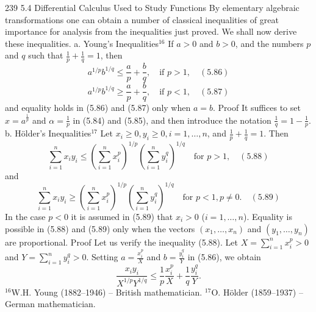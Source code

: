 239
5.4 Differential Calculus Used to Study Functions
By elementary algebraic transformations one can obtain a number of classical
inequalities of great importance for analysis from the inequalities just proved. We
shall now derive these inequalities.
a. Young's Inequalities$^{16}$
If $a > 0$ and $b > 0$, and the numbers $p$ and $q$ such that $\frac{1}{p} + \frac{1}{q} = 1$, then
$$ a^{1/p}b^{1/q} \le \frac{a}{p} + \frac{b}{q}, \quad \text{if } p > 1, \quad (5.86) $$
$$ a^{1/p}b^{1/q} \ge \frac{a}{p} + \frac{b}{q}, \quad \text{if } p < 1, \quad (5.87) $$
and equality holds in (5.86) and (5.87) only when $a = b$.
Proof It suffices to set $x = a^{\frac{1}{p}}$ and $\alpha = \frac{1}{p}$ in (5.84) and (5.85), and then introduce the
notation $\frac{1}{q} = 1 - \frac{1}{p}$.
b. Hölder's Inequalities$^{17}$
Let $x_i \ge 0, y_i \ge 0, i = 1, \dots, n$, and $\frac{1}{p} + \frac{1}{q} = 1$. Then
$$ \sum_{i=1}^{n} x_i y_i \le \left(\sum_{i=1}^{n} x_i^p\right)^{1/p} \left(\sum_{i=1}^{n} y_i^q\right)^{1/q} \quad \text{for } p > 1, \quad (5.88) $$
and
$$ \sum_{i=1}^{n} x_i y_i \ge \left(\sum_{i=1}^{n} x_i^p\right)^{1/p} \left(\sum_{i=1}^{n} y_i^q\right)^{1/q} \quad \text{for } p < 1, p \ne 0. \quad (5.89) $$
In the case $p < 0$ it is assumed in (5.89) that $x_i > 0$ ($i = 1, \dots, n$). Equality is
possible in (5.88) and (5.89) only when the vectors $(x_1,\dots,x_n)$ and $(y_1,\dots, y_n)$
are proportional.
Proof Let us verify the inequality (5.88). Let $X = \sum_{i=1}^n x_i^p > 0$ and $Y = \sum_{i=1}^n y_i^q > 0$. Setting $a = \frac{x_i^p}{X}$ and $b = \frac{y_i^q}{Y}$ in (5.86), we obtain
$$ \frac{x_i y_i}{X^{1/p}Y^{1/q}} \le \frac{1}{p} \frac{x_i^p}{X} + \frac{1}{q} \frac{y_i^q}{Y}. $$
$^{16}$W.H. Young (1882–1946) – British mathematician.
$^{17}$O. Hölder (1859–1937) – German mathematician.